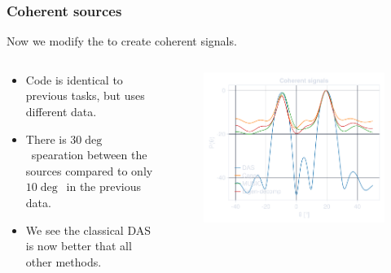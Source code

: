 \documentclass[compress,aspectratio=169]{beamer}
\begin{document}
\begin{frame}[fragile] %
    \frametitle{Coherent sources}
    Now we modify the  to create coherent signals.
    \begin{columns}
        \begin{column}{0.5\textwidth}
            \begin{itemize}
                \item Code is identical to previous tasks, but uses different
                    data.
                \item There is $30\deg$ spearation between the sources compared
                    to only $10\deg$ in the previous data.
                \item We see the classical DAS is now better that all other
                    methods.
            \end{itemize}
        \end{column}
        \begin{column}{0.5\textwidth}
            \begin{figure}
                \includegraphics[width=\columnwidth]{"../i.pdf"}
            \end{figure}
        \end{column}
    \end{columns}
\end{frame}
\end{document}
